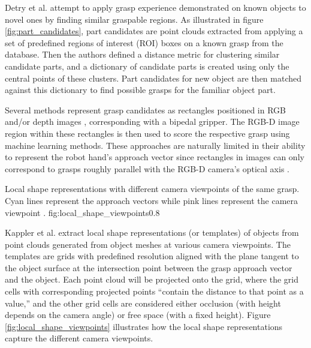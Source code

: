 Detry et al. \cite{Detry2012} attempt to apply grasp experience demonstrated on known objects to novel ones by finding
similar graspable regions. As illustrated in figure \ref{fig:part_candidates}, part candidates are point clouds
extracted from applying a set of predefined regions of interest (ROI) boxes on a known grasp from the database. Then the
authors defined a distance metric for clustering similar candidate parts, and a dictionary of candidate parts is created
using only the central points of these clusters. Part candidates for new object are then matched against this dictionary
to find possible grasps for the familiar object part.

Several methods represent grasp candidates as rectangles positioned in RGB and/or depth images
\cite{lenz2015,jiang2011}, corresponding with a bipedal gripper. The RGB-D image region within these rectangles is then
used to score the respective grasp using machine learning methods. These approaches are naturally limited in their
ability to represent the robot hand's approach vector since rectangles in images can only correspond to grasps roughly
parallel with the RGB-D camera's optical axis \cite{Gualtieri2016}.

             {Local shape representations with different camera viewpoints of the same grasp. Cyan lines represent the
              approach vectors while pink lines represent the camera viewpoint \cite{Kappler2015}.}
             {fig:local_shape_viewpoints}{0.8\textwidth}

Kappler et al. \cite{Kappler2015} extract local shape representations (or templates) of objects from point clouds
generated from object meshes at various camera viewpoints. The templates are grids with predefined resolution
aligned with the plane tangent to the object surface at the intersection point between the grasp approach vector and the
object. Each point cloud will be projected onto the grid, where the grid cells with corresponding projected points
``contain the distance to that point as a value,'' and the other grid cells are considered either occlusion
(with height depends on the camera angle) or free space (with a fixed height). Figure \ref{fig:local_shape_viewpoints}
illustrates how the local shape representations capture the different camera viewpoints.


